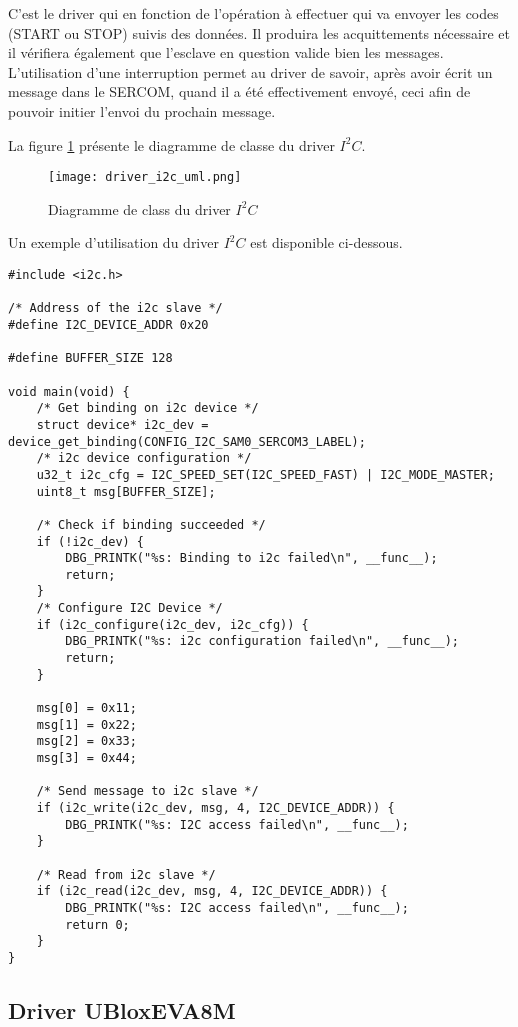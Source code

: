 C'est le driver qui en fonction de l'opération à effectuer qui va envoyer les codes (START ou STOP) suivis des données. Il produira les acquittements nécessaire et il vérifiera également que l'esclave en question valide bien les messages. L'utilisation d'une interruption permet au driver de savoir, après avoir écrit un message dans le SERCOM, quand il a été effectivement envoyé, ceci afin de pouvoir initier l'envoi du prochain message.

La figure \ref{fig:driver_i2c_uml} présente le diagramme de classe du driver $I^{2}C$.

\begin{figure}[htb]
\centering 
\texttt{[image: driver\_i2c\_uml.png]} 
\caption{Diagramme de class du driver $I^{2}C$}
\label{fig:driver_i2c_uml}
\end{figure}

Un exemple d'utilisation du driver $I^{2}C$ est disponible ci-dessous.

\begin{lstlisting}[style=CStyle]
#include <i2c.h>

/* Address of the i2c slave */
#define I2C_DEVICE_ADDR 0x20

#define BUFFER_SIZE 128

void main(void) {
	/* Get binding on i2c device */
	struct device* i2c_dev = device_get_binding(CONFIG_I2C_SAM0_SERCOM3_LABEL);
	/* i2c device configuration */
	u32_t i2c_cfg = I2C_SPEED_SET(I2C_SPEED_FAST) | I2C_MODE_MASTER;
	uint8_t msg[BUFFER_SIZE];
	
	/* Check if binding succeeded */
	if (!i2c_dev) {
		DBG_PRINTK("%s: Binding to i2c failed\n", __func__);
		return;
	}
	/* Configure I2C Device */
	if (i2c_configure(i2c_dev, i2c_cfg)) {
		DBG_PRINTK("%s: i2c configuration failed\n", __func__);
		return;
	}	
	
	msg[0] = 0x11;
	msg[1] = 0x22;
	msg[2] = 0x33;
	msg[3] = 0x44;	
	
	/* Send message to i2c slave */
	if (i2c_write(i2c_dev, msg, 4, I2C_DEVICE_ADDR)) {
		DBG_PRINTK("%s: I2C access failed\n", __func__);
	}
	
	/* Read from i2c slave */
	if (i2c_read(i2c_dev, msg, 4, I2C_DEVICE_ADDR)) {
		DBG_PRINTK("%s: I2C access failed\n", __func__);
		return 0;
	}	
}
\end{lstlisting}

\subsection{Driver UBloxEVA8M}

